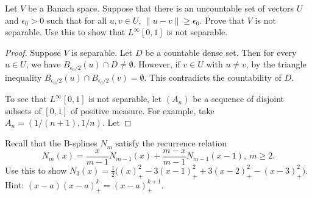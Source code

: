 \documentclass{article}
\begin{document}
 Let $V$ be a Banach space. Suppose that there is an uncountable set of vectors $U$ and $\epsilon_0 > 0$ such that for all $u,v \in U$, $\|u - v\| \ge \epsilon_0$. Prove that $V$ is not separable. Use this to show that $L^\infty[0,1]$ is not separable.
\begin{proof}
Suppose $V$ is separable.  Let $D$ be a countable dense set.  Then for every $u \in U$, we have $B_{\epsilon_0/2}(u) \cap D \neq \emptyset$.  However, if $v \in U$ with $u \neq v$, by the triangle inequality $B_{\epsilon_0/2}(u) \cap B_{\epsilon_0/2}(v) = \emptyset$. This contradicts the countability of $D$.

To see that $L^\infty[0,1]$ is not separable, let $(A_n)$ be a sequence of disjoint subsets of $[0,1]$ of positive measure.  For example, take $A_n = (1/(n+1), 1/n)$.  Let
\end{proof}

 Recall that the B-splines $N_m$ satisfy the recurrence relation
$$N_m(x) = \frac{x}{m-1}N_{m-1}(x)+\frac{m-x}{m-1}N_{m-1}(x-1),
\ m \ge 2. $$
Use this to show $N_3(x) = \frac12 \big( (x)_+^2 - 3(x-1)_+^2 + 
3(x-2)_+^2 - (x-3)_+^2\big)$. Hint: $(x-a)(x-a)_+^k=(x-a)_+^{k+1}$.
\end{document}
